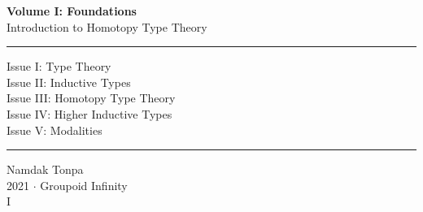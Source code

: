 \documentclass{article}
\begin{document}
\begin{titlepage}
    \centering
    \vspace*{0.5in}
    \Huge
    \textbf{Volume I: Foundations} \\
    \LARGE
    Introduction to Homotopy Type Theory \\
    \vspace{1.5in}
    \rule{\textwidth}{0.4pt}
    \flushleft
    \small
    Issue I: Type Theory \\
    Issue II: Inductive Types \\
    Issue III: Homotopy Type Theory \\
    Issue IV: Higher Inductive Types \\
    Issue V: Modalities \\
    \rule{\textwidth}{0.4pt}
    \centering
    \vfill
    \large
    Namdak Tonpa \\
    \Large
    2021 $\cdot$ Groupoid Infinity \\
    I
\end{titlepage}

\tableofcontents
\newif\ifincludeTOC
\includeTOCfalse

\newpage \begin{standalone}  \end{standalone}        %
\newpage \begin{standalone}  \end{standalone}         %
\newpage \begin{standalone}  \end{standalone}        %
\newpage \begin{standalone}  \end{standalone}         %
\newpage \begin{standalone}  \end{standalone}  %
\end{document}

